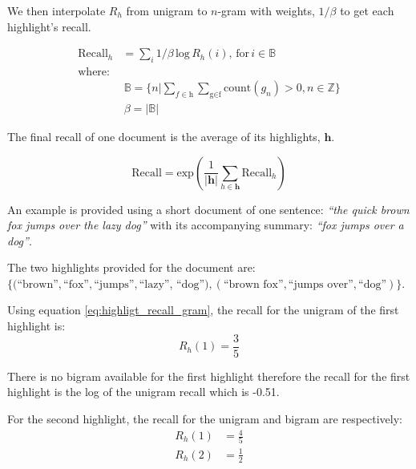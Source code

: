 \documentclass[11pt,a4paper]{article}
\begin{document}
We then interpolate $R_h$ from unigram to $n$-gram with weights, $1/\beta$ to get each highlight's recall.

\begin{equation}
\label{eq:highlight_recall}
\begin{split}
    \text{Recall}_h &= \displaystyle\sum_{i} 1/\beta \, \text{log}\, R_h (i), \, \text{for}\, i \in \mathbb{B} \\
    \text{where:} & \\
    &\, \mathbb{B} = \{n | \displaystyle\sum_{f \in \text{h}}\sum_{\text{g}\in\text{f}} \text{count}(g_n) > 0, n \in \mathbb{Z} \}\\
    &\, \beta = |\mathbb{B}|
\end{split}
\end{equation}

The final recall of one document is the average of its highlights, $\textbf{h}$.

\begin{equation}
    \text{Recall} = \text{exp}(\frac{1}{|\textbf{h}|}\displaystyle\sum_{h \in \textbf{h}} \text{Recall}_h)
\end{equation}

An example is provided using a short document of one sentence: \textit{``the quick brown fox jumps over the lazy dog''} with its accompanying summary: \textit{``fox jumps over a dog''}. 

The two highlights provided for the document are: $\{(\text{``brown''}, \text{``fox''}, \text{``jumps''}, \text{``lazy''}$, $ \text{``dog''}), (\text{``brown fox''}, \text{``jumps over''}, \text{``dog''})\}$.

Using equation \ref{eq:highligt_recall_gram}, the recall for the unigram of the first highlight is:
\begin{equation}
    R_h(1) = \frac{3}{5}
\end{equation}

There is no bigram available for the first highlight therefore the recall for the first highlight is the log of the unigram recall which is -0.51.

For the second highlight, the recall for the unigram and bigram are respectively:
\begin{equation}
    \begin{split}
        R_h(1) &= \frac{4}{5}\\
        R_h(2) &= \frac{1}{2}
    \end{split}
\end{equation}
\end{document}

